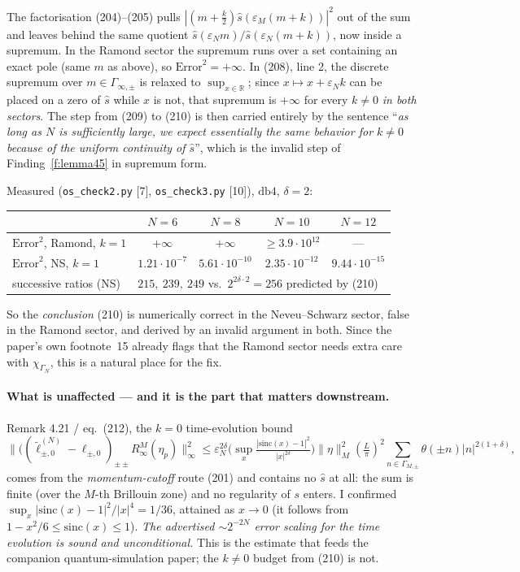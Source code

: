 \documentclass[11pt,a4paper]{article}
\theoremstyle{definition}
\newcommand{\eps}{\varepsilon}
\newcommand{\Gi}{\Gamma_{\!\infty,\pm}}
\newcommand{\sh}{\hat{s}}
\begin{document}
\noindent
The factorisation (204)--(205) pulls $|(m+\tfrac k2)\sh(\eps_M(m+k))|^2$ out of the sum and
leaves behind the same quotient $\sh(\eps_Nm)/\sh(\eps_N(m+k))$, now inside a supremum. In the
Ramond sector the supremum runs over a set containing an exact pole (same $m$ as above), so
$\mathrm{Error}^2=+\infty$. In (208), line 2, the discrete supremum over $m\in\Gi$ is relaxed to
$\sup_{x\in\mathbb R}$; since $x\mapsto x+\eps_Nk$ can be placed on a zero of $\sh$ while $x$ is
not, that supremum is $+\infty$ for every $k\neq0$ \emph{in both sectors}. The step from (209)
to (210) is then carried entirely by the sentence ``\emph{as long as $N$ is sufficiently large,
we expect essentially the same behavior for $k\neq0$ because of the uniform continuity of
$\sh$}'', which is the invalid step of Finding~\ref{f:lemma45} in supremum form.

\medskip\noindent
Measured (\texttt{os\_check2.py} [7], \texttt{os\_check3.py} [10]), $\mathrm{db}4$, $\delta=2$:
\begin{center}\small
\begin{tabular}{lcccc}
\toprule
 & $N=6$ & $N=8$ & $N=10$ & $N=12$\\
\midrule
$\mathrm{Error}^2$, Ramond, $k=1$ & $+\infty$ & $+\infty$ & $\ge3.9\cdot10^{12}$ & --- \\
$\mathrm{Error}^2$, NS, $k=1$     & $1.21\cdot10^{-7}$ & $5.61\cdot10^{-10}$ & $2.35\cdot10^{-12}$ & $9.44\cdot10^{-15}$\\
successive ratios (NS)            & \multicolumn{4}{l}{$215,\ 239,\ 249$ \quad vs.\ $2^{2\delta\cdot 2}=256$ predicted by (210)}\\
\bottomrule
\end{tabular}
\end{center}
So the \emph{conclusion} (210) is numerically correct in the Neveu--Schwarz sector, false in the
Ramond sector, and derived by an invalid argument in both. Since the paper's own footnote~15
already flags that the Ramond sector needs extra care with $\chi_{\Gamma_N}$, this is a natural
place for the fix.

\paragraph{What is unaffected --- and it is the part that matters downstream.}
Remark 4.21 / eq.~(212), the $k=0$ time-evolution bound
\[
  \big\|\big((\tilde\ell^{(N)}_{\pm,0}-\ell_{\pm,0})_{\pm\pm}R^M_\infty(\eta_p)\big\|^2_\infty
  \le \eps_N^{2\delta}\Big(\sup_{x}\tfrac{|\mathrm{sinc}(x)-1|^2}{|x|^{2\delta}}\Big)
  \|\eta\|_M^2(\tfrac L\pi)^2\!\!\sum_{n\in\Gamma_{M,\pm}}\!\!\theta(\pm n)|n|^{2(1+\delta)},
\]
comes from the \emph{momentum-cutoff} route (201) and contains no $\sh$ at all: the sum is
finite (over the $M$-th Brillouin zone) and no regularity of $s$ enters. I confirmed
$\sup_x|\mathrm{sinc}(x)-1|^2/|x|^4=1/36$, attained as $x\to0$ (it follows from
$1-x^2/6\le\mathrm{sinc}(x)\le1$). \emph{The advertised $\sim2^{-2N}$ error scaling for the
time evolution is sound and unconditional.} This is the estimate that feeds the companion
quantum-simulation paper; the $k\neq0$ budget from (210) is not.
\end{document}
